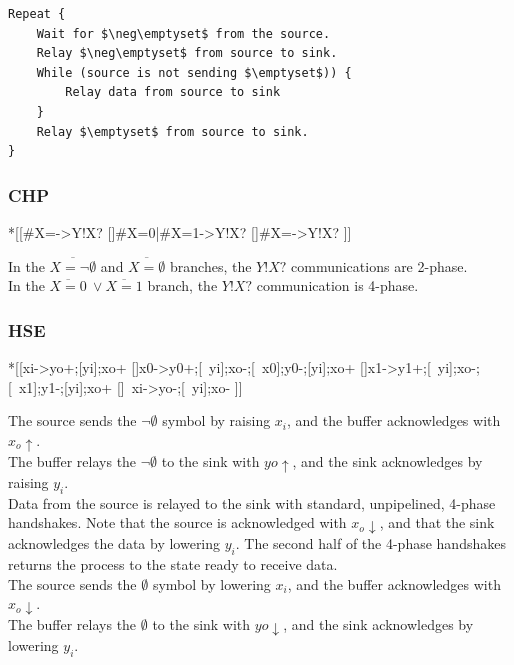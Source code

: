 \documentclass{article}
\begin{document}
\begin{lstlisting}[mathescape]
Repeat {
    Wait for $\neg\emptyset$ from the source.
    Relay $\neg\emptyset$ from source to sink.
    While (source is not sending $\emptyset$)) {
        Relay data from source to sink
    }
    Relay $\emptyset$ from source to sink.
}
\end{lstlisting}

\subsubsection*{CHP}

\begin{csp}
*[[#{X=\neg\emptyset}->Y!X?
  []#{X=0}|#{X=1}->Y!X?
  []#{X=\emptyset}->Y!X?
 ]]
\end{csp}

\noindent
In the $\overline{X=\neg\emptyset}$ and $\overline{X=\emptyset}$ branches,
the $Y!X?$ communications are 2-phase. \\
In the $\overline{X=0}\ \vee \overline{X=1}$ branch,
the $Y!X?$ communication is 4-phase.


\subsubsection*{HSE}

\begin{hse}
*[[xi->yo+;[yi];xo+
  []x0->y0+;[~yi];xo-;[~x0];y0-;[yi];xo+
  []x1->y1+;[~yi];xo-;[~x1];y1-;[yi];xo+
  []~xi->yo-;[~yi];xo-
 ]]
\end{hse}

\noindent
The source sends the $\neg\emptyset$ symbol by raising $x_i$, and the buffer
acknowledges with $x_o\uparrow$. \\
The buffer relays the $\neg\emptyset$ to the sink with $yo\uparrow$, and the
sink acknowledges by raising $y_i$. \\
Data from the source is relayed to the sink with standard, unpipelined,
4-phase handshakes. Note that the source is acknowledged with $x_o\downarrow$, 
and that the sink acknowledges the data by lowering $y_i$. 
The second half of the 4-phase handshakes returns the process to the state 
ready to receive data. \\
The source sends the $\emptyset$ symbol by lowering $x_i$, and the buffer
acknowledges with $x_o\downarrow$. \\
The buffer relays the $\emptyset$ to the sink with $yo\downarrow$, and the
sink acknowledges by lowering $y_i$. \\
\end{document}
